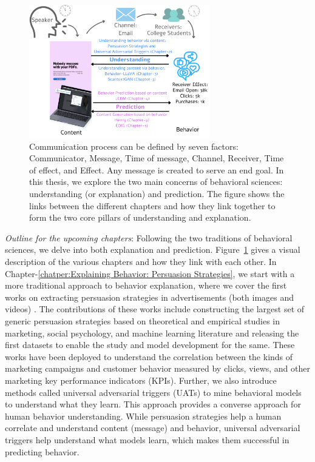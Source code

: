 \begin{figure}[!t]
  \centering
  \includegraphics[width=0.7\textwidth]{images/thesis-link.pdf}
  \caption{Communication process can be defined by seven factors: Communicator, Message, Time of message, Channel, Receiver, Time of effect, and Effect. Any message is created to serve an end goal. In this thesis, we explore the two main concerns of behavioral sciences: understanding (or explanation) and prediction. The figure shows the links between the different chapters and how they link together to form the two core pillars of understanding and explanation. \label{fig:factors-of-communication-thesis-links}}
\end{figure}



\textit{Outline for the upcoming chapters}: Following the two traditions of behavioral sciences, we delve into both explanation and prediction. Figure~\ref{fig:factors-of-communication-thesis-links} gives a visual description of the various chapters and how they link with each other. In Chapter-\ref{chatper:Explaining Behavior: Persuasion Strategies}, we start with a more traditional approach to behavior explanation, where we cover the first works on extracting persuasion strategies in advertisements (both images and videos) \cite{kumar2023persuasion,bhattacharya2023video}. The contributions of these works include constructing the largest set of generic persuasion strategies based on theoretical and empirical studies in marketing, social psychology, and machine learning literature and releasing the first datasets to enable the study and model development for the same. These works have been deployed to understand the correlation between the kinds of marketing campaigns and customer behavior measured by clicks, views, and other marketing key performance indicators (KPIs). Further, we also introduce methods called universal adversarial triggers (UATs) to mine behavioral models to understand what they learn. This approach provides a converse approach for human behavior understanding. While persuasion strategies help a human correlate and understand content (message) and behavior, universal adversarial triggers help understand what models learn, which makes them successful in predicting behavior.



